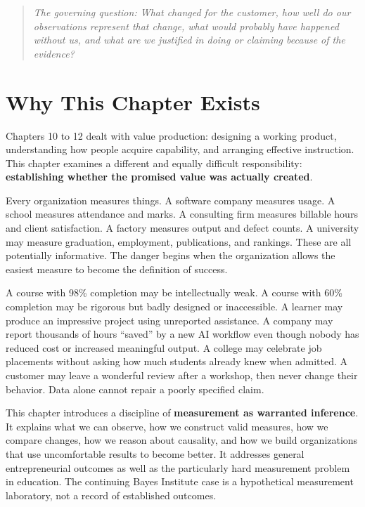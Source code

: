\begin{quote}
\itshape
The governing question: What changed for the customer, how well do our observations represent that change, what would probably have happened without us, and what are we justified in doing or claiming because of the evidence?
\end{quote}

\section*{Why This Chapter Exists}

Chapters 10 to 12 dealt with value production: designing a working product, understanding how people acquire capability, and arranging effective instruction. This chapter examines a different and equally difficult responsibility: \textbf{establishing whether the promised value was actually created}.

Every organization measures things. A software company measures usage. A school measures attendance and marks. A consulting firm measures billable hours and client satisfaction. A factory measures output and defect counts. A university may measure graduation, employment, publications, and rankings. These are all potentially informative. The danger begins when the organization allows the easiest measure to become the definition of success.

A course with 98\% completion may be intellectually weak. A course with 60\% completion may be rigorous but badly designed or inaccessible. A learner may produce an impressive project using unreported assistance. A company may report thousands of hours ``saved'' by a new AI workflow even though nobody has reduced cost or increased meaningful output. A college may celebrate job placements without asking how much students already knew when admitted. A customer may leave a wonderful review after a workshop, then never change their behavior. Data alone cannot repair a poorly specified claim.

This chapter introduces a discipline of \textbf{measurement as warranted inference}. It explains what we can observe, how we construct valid measures, how we compare changes, how we reason about causality, and how we build organizations that use uncomfortable results to become better. It addresses general entrepreneurial outcomes as well as the particularly hard measurement problem in education. The continuing Bayes Institute case is a hypothetical measurement laboratory, not a record of established outcomes.

